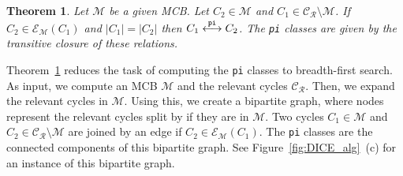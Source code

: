 \documentclass[fleqn,11pt]{article}
\newtheorem{theorem}{Theorem}
\newcommand\calM{\mathcal{M}}
\newcommand\calX{\mathcal{X}}     %
\newcommand\calY{\mathcal{Y}}
\newcommand\RelCyc{\mathcal{C_R}} %
\newcommand\expand[2]{\mathcal{E}_{#1}\left(#2\right)}   %
\newcommand\expandd[2]{\mathcal{E}_{#1}(#2)}             %
\newcommand\pInt{ \stackrel{\tt pi}{\longleftrightarrow} }
\newcommand\smCyc{\textnormal{(smaller cycles)}}
\begin{document}







\begin{theorem}
	Let $\calM$ be a given MCB. Let $C_2\in\calM$ and $C_1\in\RelCyc{\setminus}\calM$. If $C_2\in\expandd{\calM}{C_1}$ and $|C_1|=|C_2|$ then $C_1\pInt C_2$.
	The {\tt pi} classes are given by the transitive closure of these relations.\nolinebreak %
	\label{Thm:DirInt_Comp}
\end{theorem}



Theorem~\ref{Thm:DirInt_Comp} reduces the task of computing the {\tt pi} classes to breadth-first search. As input, we compute an MCB $\calM$ and the relevant cycles $\RelCyc$. Then, we expand the relevant cycles in $\calM$. Using this, we create a bipartite graph, where nodes represent the relevant cycles split by if they are in $\calM$. Two cycles $C_1\in\calM$ and $C_2\in\RelCyc\setminus\calM$ are joined by an edge if $C_2\in\expand{\calM}{C_1}$. The {\tt pi} classes are the connected components of this bipartite graph. See Figure~\ref{fig:DICE_alg}~(c) for an instance of this bipartite graph.


%	
\end{document}
